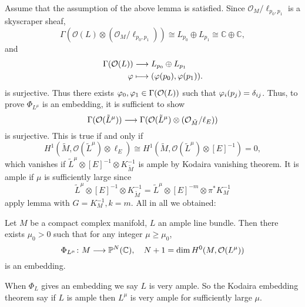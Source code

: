 \documentclass[12pt]{article}
\begin{document}
Assume that the assumption of the above lemma is satisfied. Since \(\mathcal{O}_M
/\ell_{p_0,p_1}\) is a skyscraper sheaf, \[
  \Gamma(\mathcal{O}(L)\otimes (\mathcal{O}_M/\ell_{p_0,p_1}))\cong L_{p_0}
  \oplus L_{p_1}\cong \mathbb{C}\oplus \mathbb{C}
,\] and
\begin{align*}
  \Gamma(\mathcal{O}(L)) &\longrightarrow L_{p_0}\oplus L_{p_1} \\
  \varphi &\longmapsto (\varphi(p_0),\varphi(p_1))
.\end{align*}
is surjective. Thus there exists \(\varphi_0,\varphi_1\in \Gamma(\mathcal{O}(L))\)
such that \(\varphi_i(p_j)=\delta_{ij}\). Thus, to prove \(\Phi_{L^\mu}\) is an
embedding, it is sufficient to show \[
  \Gamma(\mathcal{O}(\tilde{L}^\mu))\longrightarrow \Gamma(\mathcal{O}(\tilde{L}^\mu)
  \otimes (\mathcal{O}_{\tilde{M}}/\ell_E))
\] is surjective. This is true if and only if \[
  H^1(\tilde{M},\mathcal{O}(\tilde{L}^\mu)\otimes \ell_E)\cong 
  H^1(\tilde{M},\mathcal{O}(\tilde{L}^\mu)\otimes [E]^{-1})=0
,\] which vanishes if \(\tilde{L}^\mu\otimes[E]^{-1}\otimes K_{\tilde{M}}^{-1}\)
is ample by Kodaira vanishing theorem. It is ample if \(\mu\) is sufficiently
large since \[
  \tilde{L}^\mu\otimes [E]^{-1}\otimes K_{\tilde{M}}^{-1}
  =\tilde{L}^\mu\otimes [E]^{-m}\otimes \pi^*K_M^{-1}
\] apply lemma with \(G=K_M^{-1},k=m\). All in all we obtained:
\begin{theorem}
  Let \(M\) be a compact complex manifold, \(L\) an ample line bundle. Then
  there exists \(\mu_0>0\) such that for any integer \(\mu\ge \mu_0\), \[
    \Phi_{L^\mu}\colon M\longrightarrow \mathbb{P}^N(\mathbb{C}),\quad
    N+1=\dim H^0(M,\mathcal{O}(L^\mu))
  \] is an embedding.
\end{theorem}

\begin{remark}
  When \(\Phi_L\) gives an embedding we say \(L\) is very ample. So the Kodaira
  embedding theorem say if \(L\) is ample then \(L^\mu\) is very ample for
  sufficiently large \(\mu\).
\end{remark}
\end{document}
